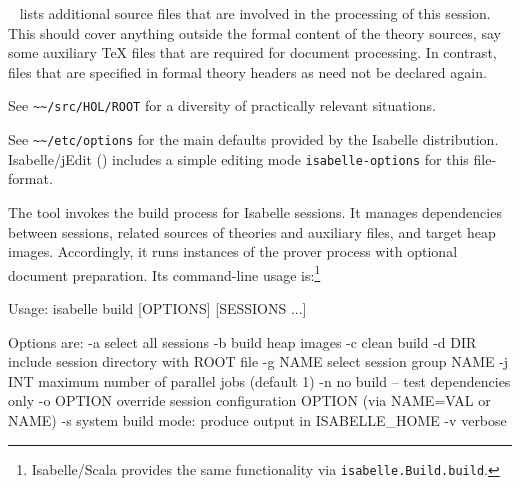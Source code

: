 \begin{isabellebody}
\begin{isamarkuptext}
\begin{description}
  \item {}~ lists additional source
  files that are involved in the processing of this session.  This
  should cover anything outside the formal content of the theory
  sources, say some auxiliary {\TeX} files that are required for
  document processing.  In contrast, files that are specified in
  formal theory headers as \hyperlink{keyword.uses}{\mbox{}} need not be declared
  again.

  \end{description}%
\end{isamarkuptext}%
\isamarkuptrue%
%
\isamarkuptrue%
%
\begin{isamarkuptext}%
See \verb|~~/src/HOL/ROOT| for a diversity of practically
  relevant situations.%
\end{isamarkuptext}%
\isamarkuptrue%
%
\isamarkuptrue%
%
\begin{isamarkuptext}%
See \verb|~~/etc/options| for the main defaults provided by
  the Isabelle distribution.  Isabelle/jEdit ()
  includes a simple editing mode \verb|isabelle-options| for
  this file-format.%
\end{isamarkuptext}%
\isamarkuptrue%
%
\isamarkuptrue%
%
\begin{isamarkuptext}%
The \hypertarget{tool.build}{\hyperlink{tool.build}{\mbox{}}} tool invokes the build process for
  Isabelle sessions.  It manages dependencies between sessions,
  related sources of theories and auxiliary files, and target heap
  images.  Accordingly, it runs instances of the prover process with
  optional document preparation.  Its command-line usage
  is:\footnote{Isabelle/Scala provides the same functionality via
  \texttt{isabelle.Build.build}.}
\begin{ttbox}
Usage: isabelle build [OPTIONS] [SESSIONS ...]

  Options are:
    -a           select all sessions
    -b           build heap images
    -c           clean build
    -d DIR       include session directory with ROOT file
    -g NAME      select session group NAME
    -j INT       maximum number of parallel jobs (default 1)
    -n           no build -- test dependencies only
    -o OPTION    override session configuration OPTION
                 (via NAME=VAL or NAME)
    -s           system build mode: produce output in ISABELLE_HOME
    -v           verbose


\end{ttbox}
\end{isamarkuptext}
\end{isabellebody}
